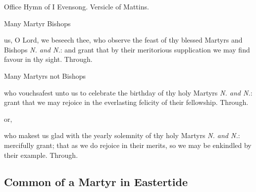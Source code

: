 \secondEvensong


\begin{rubric}
	Office Hymn of I Evensong. Versicle of Mattins.
\end{rubric}


\collect\label{CommonMartyrsBishopsCollect}
\begin{inhead}
	Many Martyr Bishops
\end{inhead}
 us, O Lord, we beseech thee, who observe the feast of thy blessed Martyrs and Bishops \textit{N. and N.}: and grant that by their meritorious supplication we may find favour in thy sight. Through.

\begin{inhead}\label{CommonMartyrsNotBishopsCollect}
	Many Martyrs not Bishops
\end{inhead}
 who vouchsafest unto us to celebrate the birthday of thy holy Martyrs
\textit{N. and N.}: grant that we may rejoice in the everlasting felicity of their fellowship. Through.
\begin{inhead}
	or,
\end{inhead}
 who makest us glad with the yearly solemnity of thy holy Martyrs \textit{N. and N.}: mercifully grant; that as we do rejoice in their merits, so we may be enkindled by their example. Through.


\subsection{Common of a Martyr in Eastertide}\label{CommonMartyrEaster}

